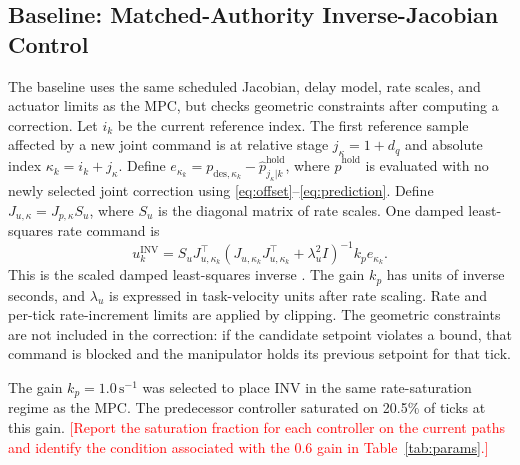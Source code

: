 \documentclass[journal]{IEEEtran}
\newcommand{\TBD}[1]{\textcolor{red}{[#1]}}
\begin{document}
\subsection{Baseline: Matched-Authority Inverse-Jacobian Control}
\label{sec:inv7}

The baseline uses the same scheduled Jacobian, delay model, rate scales,
and actuator limits as the MPC, but checks geometric constraints after
computing a correction. Let $i_k$ be the current reference index.
The first reference sample affected by a new joint command is at
relative stage $j_\kappa=1+d_q$ and absolute index
$\kappa_k=i_k+j_\kappa$.
Define $e_{\kappa_k}=p_{\mathrm{des},\kappa_k}-\hat p^{\mathrm{hold}}_{j_\kappa|k}$,
where $\hat p^{\mathrm{hold}}$ is evaluated with no newly selected
joint correction using \eqref{eq:offset}--\eqref{eq:prediction}. Define
$J_{u,\kappa}=J_{p,\kappa}S_u$, where $S_u$ is the diagonal matrix of
rate scales. One damped least-squares rate command is
\begin{equation}
u^{\mathrm{INV}}_k
=S_uJ_{u,\kappa_k}^\top
\left(J_{u,\kappa_k}J_{u,\kappa_k}^\top
+\lambda_u^2I\right)^{-1}
k_p e_{\kappa_k}.
\label{eq:inv7}
\end{equation}
This is the scaled damped least-squares inverse
\cite{wampler1986dls}. The gain $k_p$ has units of inverse seconds,
and $\lambda_u$ is expressed in task-velocity units after rate
scaling. Rate and per-tick rate-increment limits are applied by
clipping. The geometric constraints are not included in the
correction: if the candidate setpoint violates a bound, that command
is blocked and the manipulator holds its previous setpoint for that
tick.

The gain $k_p=1.0\,\mathrm{s}^{-1}$ was selected to place INV in the
same rate-saturation regime as the MPC. The predecessor controller
saturated on 20.5\% of ticks at this gain. \TBD{Report the saturation
fraction for each controller on the current paths and identify the
condition associated with the $0.6$ gain in Table~\ref{tab:params}.}
\end{document}
